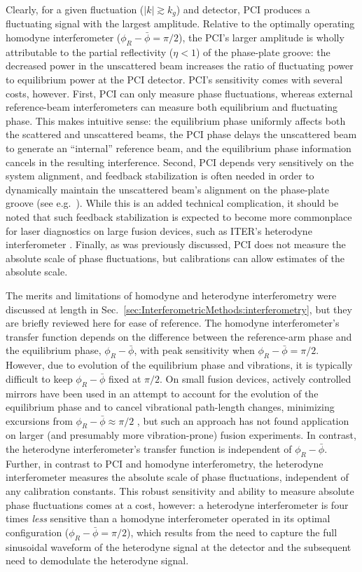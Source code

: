 Clearly, for a given fluctuation ($|k| \gtrsim k_g$) and detector,
PCI produces a fluctuating signal with the largest amplitude.
Relative to the optimally operating homodyne interferometer
($\phi_R - \bar{\phi} = \pi / 2$),
the PCI's larger amplitude is wholly attributable
to the partial reflectivity ($\eta < 1$) of the phase-plate groove:
the decreased power in the unscattered beam
increases the ratio of fluctuating power to equilibrium power
at the PCI detector.
PCI's sensitivity comes with several costs, however.
First, PCI can only measure phase fluctuations,
whereas external reference-beam interferometers
can measure both equilibrium and fluctuating phase.
This makes intuitive sense:
the equilibrium phase uniformly affects
both the scattered and unscattered beams,
the PCI phase delays the unscattered beam
to generate an ``internal'' reference beam, and
the equilibrium phase information cancels in the resulting interference.
Second, PCI depends very sensitively on the system alignment, and
feedback stabilization is often needed
in order to dynamically maintain
the unscattered beam's alignment on the phase-plate groove
(see e.g.~\cite[Ch.~3.5]{coda_phd}).
While this is an added technical complication,
it should be noted that such feedback stabilization
is expected to become more commonplace
for laser diagnostics on large fusion devices,
such as ITER's heterodyne interferometer
\cite{vanzeeland_TIP_rsi13}.
Finally, as was previously discussed,
PCI does not measure the absolute scale of phase fluctuations, but
calibrations can allow estimates of the absolute scale.

The merits and limitations of homodyne and heterodyne interferometry
were discussed at length in
Sec.~{\ref{sec:InterferometricMethods:interferometry}}, but
they are briefly reviewed here for ease of reference.
The homodyne interferometer's transfer function depends on
the difference between the reference-arm phase and
the equilibrium phase, $\phi_R - \bar{\phi}$,
with peak sensitivity when
$\phi_R - \bar{\phi} = \pi / 2$.
However, due to evolution of the equilibrium phase and vibrations,
it is typically difficult to keep $\phi_R - \bar{\phi}$ fixed at $\pi / 2$.
On small fusion devices,
actively controlled mirrors have been used in an attempt
to account for the evolution of the equilibrium phase and
to cancel vibrational path-length changes,
minimizing excursions from $\phi_R - \bar{\phi} \approx \pi / 2$
\cite{nazikian_rsi87}, but
such an approach has not found application on larger
(and presumably more vibration-prone) fusion experiments.
In contrast, the heterodyne interferometer's transfer function
is independent of $\phi_R - \bar{\phi}$.
Further, in contrast to PCI and homodyne interferometry,
the heterodyne interferometer measures
the absolute scale of phase fluctuations,
independent of any calibration constants.
This robust sensitivity and ability to measure absolute phase fluctuations
comes at a cost, however:
a heterodyne interferometer is four times \emph{less} sensitive
than a homodyne interferometer operated in its optimal configuration
($\phi_R - \bar{\phi} = \pi / 2$), which results from
the need to capture the full sinusoidal waveform
of the heterodyne signal at the detector and
the subsequent need to demodulate the heterodyne signal.


